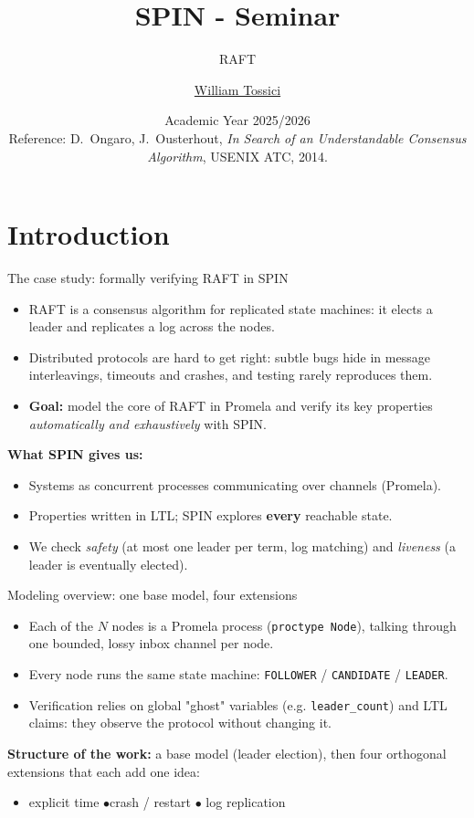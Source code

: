 \documentclass{beamer}
\title{SPIN - Seminar }
\subtitle{RAFT}
\author{\href{mailto:andrea@gasparini.cloud}{William Tossici}}
\date{Academic Year 2025/2026\\[3mm]%
  {\tiny Reference: D.~Ongaro, J.~Ousterhout,
   \emph{In Search of an Understandable Consensus Algorithm}, USENIX ATC, 2014.}}
\begin{document}
\maketitle

\section{Introduction}

\begin{frame}{The case study: formally verifying RAFT in SPIN}
  \begin{itemize}
    \item RAFT is a consensus algorithm for replicated state machines:
          it elects a leader and replicates a log across the nodes.
    \item Distributed protocols are hard to get right: subtle bugs hide in
          message interleavings, timeouts and crashes, and testing rarely
          reproduces them.
    \item \textbf{Goal:} model the core of RAFT in Promela and verify its key
          properties \emph{automatically and exhaustively} with SPIN.
  \end{itemize}
  \vfill
  \textbf{What SPIN gives us:}
  \begin{itemize}
    \item Systems as concurrent processes communicating over channels (Promela).
    \item Properties written in LTL; SPIN explores \textbf{every} reachable state.
    \item We check \emph{safety} (at most one leader per term, log matching)
          and \emph{liveness} (a leader is eventually elected).
  \end{itemize}
\end{frame}

\begin{frame}{Modeling overview: one base model, four extensions}
  \begin{itemize}
    \item Each of the $N$ nodes is a Promela process (\texttt{proctype Node}),
          talking through one bounded, lossy inbox channel per node.
    \item Every node runs the same state machine:
          \texttt{FOLLOWER} / \texttt{CANDIDATE} / \texttt{LEADER}.
    \item Verification relies on global "ghost" variables (e.g.
          \texttt{leader\_count}) and LTL claims: they observe the protocol
          without changing it.
  \end{itemize}
  \vfill
  \textbf{Structure of the work:} a base model (leader election), then four
  orthogonal extensions that each add one idea:
  \begin{itemize}
    \item explicit time \quad$\bullet$\quad crash / restart \quad$\bullet$\quad
          log replication
  \end{itemize}
\end{frame}
\end{document}
